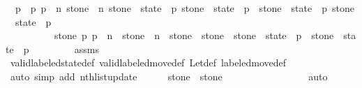 \begin{isabellebody}
\ {\isacharasterisk}{\isacharasterisk}{\isacharcolon}\ {\isachardoublequoteopen}p{}{\isacharprime}\ {\isacharless}\ p{}{\isacharprime}{\isachardoublequoteclose}\ {\isachardoublequoteopen}p{}{\isacharprime}\ {\isasymle}\ n{\isachardoublequoteclose}\ {\isachardoublequoteopen}stone{\isacharprime}\ {\isacharless}\ n{\isachardoublequoteclose}\ {\isachardoublequoteopen}stone{\isacharprime}\ {\isasymin}\ state\ {\isacharbang}\ p{}{\isacharprime}{\isachardoublequoteclose}\ {\isachardoublequoteopen}stone{\isacharprime}\ {\isasymnotin}\ state{\isacharprime}\ {\isacharbang}\ p{}{\isacharprime}{\isachardoublequoteclose}\ \ {\isachardoublequoteopen}stone{\isacharprime}\ {\isasymnotin}\ state\ {\isacharbang}\ p{}{\isacharprime}{\isachardoublequoteclose}\ {\isachardoublequoteopen}stone{\isacharprime}\ {\isasymin}\ state{\isacharprime}\ {\isacharbang}\ p{}{\isacharprime}{\isachardoublequoteclose}\ \isanewline
\ \ \ \ \ \ \ \ \ {\isachardoublequoteopen}{\isasymforall}\ stone{\isacharprime}{\isacharprime}\ p{\isachardot}\ p\ {\isasymle}\ n\ {\isasymand}\ stone{\isacharprime}{\isacharprime}\ {\isacharless}\ n\ {\isasymand}\ stone{\isacharprime}{\isacharprime}\ {\isasymnoteq}\ stone{\isacharprime}\ {\isasymlongrightarrow}\ {\isacharparenleft}stone{\isacharprime}{\isacharprime}\ {\isasymin}\ state\ {\isacharbang}\ p\ {\isasymlongleftrightarrow}\ stone{\isacharprime}{\isacharprime}\ {\isasymin}\ state{\isacharprime}\ {\isacharbang}\ p{\isacharparenright}{\isachardoublequoteclose}\isanewline
\ \ \ \ \ \ \isamarkupfalse%
\ {\isacharasterisk}{\isacharasterisk}\ assms{\isacharparenleft}{}{\isacharparenright}\isanewline
\ \ \ \ \ \ \isamarkupfalse%
\ valid{\isacharunderscore}labeled{\isacharunderscore}state{\isacharunderscore}def\ valid{\isacharunderscore}labeled{\isacharunderscore}move{\isacharprime}{\isacharunderscore}def\ Let{\isacharunderscore}def\ labeled{\isacharunderscore}move{\isacharunderscore}def\isanewline
\ \ \ \ \ \ \isamarkupfalse%
\ {\isacharparenleft}auto\ simp\ add{\isacharcolon}\ nth{\isacharunderscore}list{\isacharunderscore}update{\isacharparenright}\isanewline
\isanewline
\ \ \ \ \isamarkupfalse%
\ {\isachardoublequoteopen}stone\ {\isacharequal}\ stone{\isacharprime}{\isachardoublequoteclose}\isanewline
\ \ \ \ \ \ \isamarkupfalse%
\ {\isacharasterisk}\ {\isacharasterisk}{\isacharasterisk}\isanewline
\ \ \ \ \ \ \isamarkupfalse%
\ auto\isanewline
\isanewline
\ \ \ \ \isamarkupfalse%

\end{isabellebody}
